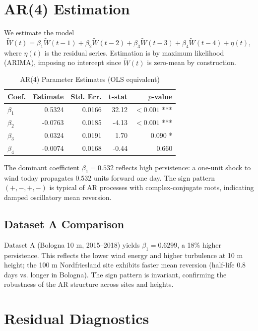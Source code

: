 \documentclass[11pt]{article}
\begin{document}
\section{AR(4) Estimation}

We estimate the model
$$\widetilde{W}(t) = \beta_1 \widetilde{W}(t-1) + \beta_2 \widetilde{W}(t-2) + \beta_3 \widetilde{W}(t-3) + \beta_4 \widetilde{W}(t-4) + \eta(t),$$
where $\eta(t)$ is the residual series. Estimation is by maximum likelihood (ARIMA), imposing no intercept since $\widetilde{W}(t)$ is zero-mean by construction.

\begin{table}[h]
\centering
\caption{AR(4) Parameter Estimates (OLS equivalent)}
\label{tab:ar4_coefs}
\begin{tabular}{lrrrr}
\toprule
\textbf{Coef.} & \textbf{Estimate} & \textbf{Std. Err.} & \textbf{t-stat} & \textbf{$p$-value} \\
\midrule
$\beta_1$ & 0.5324 & 0.0166 & 32.12 & $<0.001$ *** \\
$\beta_2$ & -0.0763 & 0.0185 & -4.13 & $<0.001$ *** \\
$\beta_3$ & 0.0324 & 0.0191 & 1.70 & 0.090 * \\
$\beta_4$ & -0.0074 & 0.0168 & -0.44 & 0.660 \\
\bottomrule
\end{tabular}
\end{table}

The dominant coefficient $\beta_1 = 0.532$ reflects high persistence: a one-unit shock to wind today propagates 0.532 units forward one day. The sign pattern $(+, -, +, -)$ is typical of AR processes with complex-conjugate roots, indicating damped oscillatory mean reversion.

\subsection{Dataset A Comparison}

Dataset A (Bologna 10 m, 2015--2018) yields $\beta_1 = 0.6299$, a 18\% higher persistence. This reflects the lower wind energy and higher turbulence at 10 m height; the 100 m Nordfriesland site exhibits faster mean reversion (half-life 0.8 days vs. longer in Bologna). The sign pattern is invariant, confirming the robustness of the AR structure across sites and heights.

\section{Residual Diagnostics}
\end{document}
